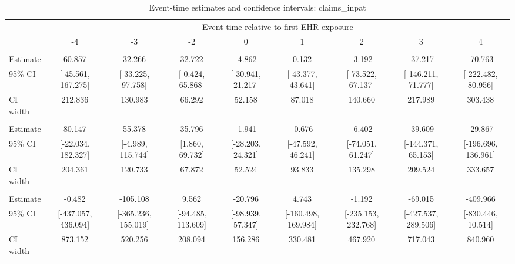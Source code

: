 
\begin{landscape}\begin{table}[!h]
\centering
\caption{\label{tab:ci_claims_inpat}Event-time estimates and confidence intervals: claims_inpat}
\centering
\fontsize{9}{11}\selectfont
\begin{tabular}[t]{lcccccccc}
\toprule
\multicolumn{1}{c}{ } & \multicolumn{8}{c}{Event time relative to first EHR exposure} \\
\cmidrule(l{3pt}r{3pt}){2-9}
 & -4 & -3 & -2 & 0 & 1 & 2 & 3 & 4\\
\midrule
\addlinespace[0.3em]
\multicolumn{9}{l}{\textbf{All}}\\
\hspace{1em}Estimate & 60.857 & 32.266 & 32.722 & -4.862 & 0.132 & -3.192 & -37.217 & -70.763\\
\hspace{1em}95\% CI & {}[-45.561, 167.275] & {}[-33.225, 97.758] & {}[-0.424, 65.868] & {}[-30.941, 21.217] & {}[-43.377, 43.641] & {}[-73.522, 67.137] & {}[-146.211, 71.777] & {}[-222.482, 80.956]\\
\hspace{1em}CI width & 212.836 & 130.983 & 66.292 & 52.158 & 87.018 & 140.660 & 217.989 & 303.438\\
\addlinespace[0.3em]
\multicolumn{9}{l}{\textbf{Age $\leq$ 60}}\\
\hspace{1em}Estimate & 80.147 & 55.378 & 35.796 & -1.941 & -0.676 & -6.402 & -39.609 & -29.867\\
\hspace{1em}95\% CI & {}[-22.034, 182.327] & {}[-4.989, 115.744] & {}[1.860, 69.732] & {}[-28.203, 24.321] & {}[-47.592, 46.241] & {}[-74.051, 61.247] & {}[-144.371, 65.153] & {}[-196.696, 136.961]\\
\hspace{1em}CI width & 204.361 & 120.733 & 67.872 & 52.524 & 93.833 & 135.298 & 209.524 & 333.657\\
\addlinespace[0.3em]
\multicolumn{9}{l}{\textbf{Age $\geq$ 60}}\\
\hspace{1em}Estimate & -0.482 & -105.108 & 9.562 & -20.796 & 4.743 & -1.192 & -69.015 & -409.966\\
\hspace{1em}95\% CI & {}[-437.057, 436.094] & {}[-365.236, 155.019] & {}[-94.485, 113.609] & {}[-98.939, 57.347] & {}[-160.498, 169.984] & {}[-235.153, 232.768] & {}[-427.537, 289.506] & {}[-830.446, 10.514]\\
\hspace{1em}CI width & 873.152 & 520.256 & 208.094 & 156.286 & 330.481 & 467.920 & 717.043 & 840.960\\
\bottomrule
\end{tabular}
\end{table}
\end{landscape}
